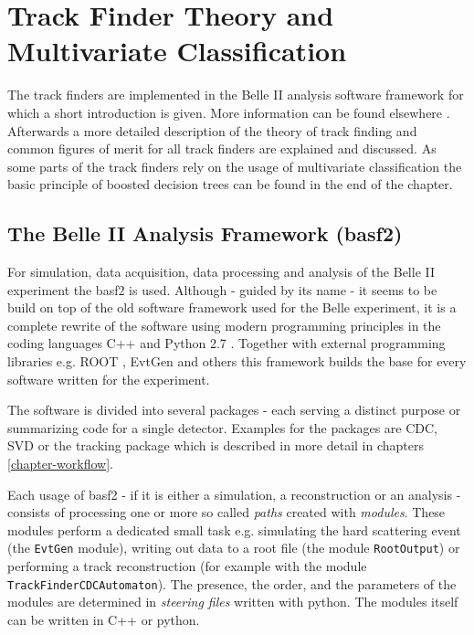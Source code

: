 \chapter{Track Finder Theory and Multivariate Classification}

The track finders are implemented in the Belle II analysis software framework for which a short introduction is given. More information can be found elsewhere \cite{tdr}. Afterwards a more detailed description of the theory of track finding and common figures of merit for all track finders are explained and discussed. As some parts of the track finders rely on the usage of multivariate classification the basic principle of boosted decision trees can be found in the end of the chapter.

\section{The Belle II Analysis Framework (basf2)}

For simulation, data acquisition, data processing and analysis of the Belle II experiment the basf2 is used. Although - guided by its name - it seems to be build on top of the old software framework used for the Belle experiment, it is a complete rewrite of the software using modern programming principles in the coding languages C++ \cite{cpp} and Python 2.7 \cite{python}. Together with external programming libraries e.g. ROOT \cite{root}, EvtGen \cite{evtgen} and others this framework builds the base for every software written for the experiment.

The software is divided into several packages - each serving a distinct purpose or summarizing code for a single detector. Examples for the packages are CDC, SVD or the tracking package which is described in more detail in chapters \ref{chapter-workflow}.

Each usage of basf2 - if it is either a simulation, a reconstruction or an analysis - consists of processing one or more so called \emph{paths} created with \emph{modules}. These modules perform a dedicated small task e.g. simulating the hard scattering event (the \texttt{EvtGen} module), writing out data to a root file (the module \texttt{RootOutput}) or performing a track reconstruction (for example with the module \texttt{TrackFinderCDCAutomaton}). The presence, the order, and the parameters of the modules are determined in \emph{steering files} written with python. The modules itself can be written in C++ or python. 

